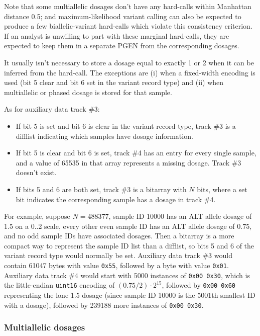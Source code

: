 \documentclass[8pt]{article}
\begin{document}
Note that some multiallelic dosages don't have any hard-calls within Manhattan
distance 0.5; and maximum-likelihood variant calling can also be expected to
produce a few biallelic-variant hard-calls which violate this consistency
criterion.  If an analyst is unwilling to part with these marginal hard-calls,
they are expected to keep them in a separate PGEN from the corresponding
dosages.

It usually isn't necessary to store a dosage equal to exactly 1 or 2 when it
can be inferred from the hard-call.  The exceptions are (i) when a fixed-width
encoding is used (bit 5 clear and bit 6 set in the variant record type) and
(ii) when multiallelic or phased dosage is stored for that sample.

As for auxiliary data track \#3:

\begin{itemize}
\item If bit 5 is set and bit 6 is clear in the variant record type, track \#3
  is a difflist indicating which samples have dosage information.
\item If bit 5 is clear and bit 6 is set, track \#4 has an entry for every
  single sample, and a value of 65535 in that array represents a missing
  dosage.  Track \#3 doesn't exist.
\item If bits 5 and 6 are both set, track \#3 is a bitarray with $N$ bits,
  where a set bit indicates the corresponding sample has a dosage in track \#4.
\end{itemize}

For example, suppose $N=488377$, sample ID 10000 has an ALT allele dosage of
1.5 on a 0..2 scale, every other even sample ID has an ALT allele dosage of
0.75, and no odd sample IDs have associated dosages.  Then a bitarray is a more
compact way to represent the sample ID list than a difflist, so bits 5 and 6 of
the variant record type would normally be set.  Auxiliary data track \#3 would
contain 61047 bytes with value \texttt{0x55}, followed by a byte with value
\texttt{0x01}.  Auxiliary data track \#4 would start with 5000 instances of
\texttt{0x00 0x30}, which is the little-endian \texttt{uint16} encoding of
$(0.75/2)\cdot 2^{15}$, followed by \texttt{0x00 0x60} representing the lone
1.5 dosage (since sample ID 10000 is the 5001th smallest ID with a dosage),
followed by 239188 more instances of \texttt{0x00 0x30}.

\subsubsection{Multiallelic dosages}
\end{document}
